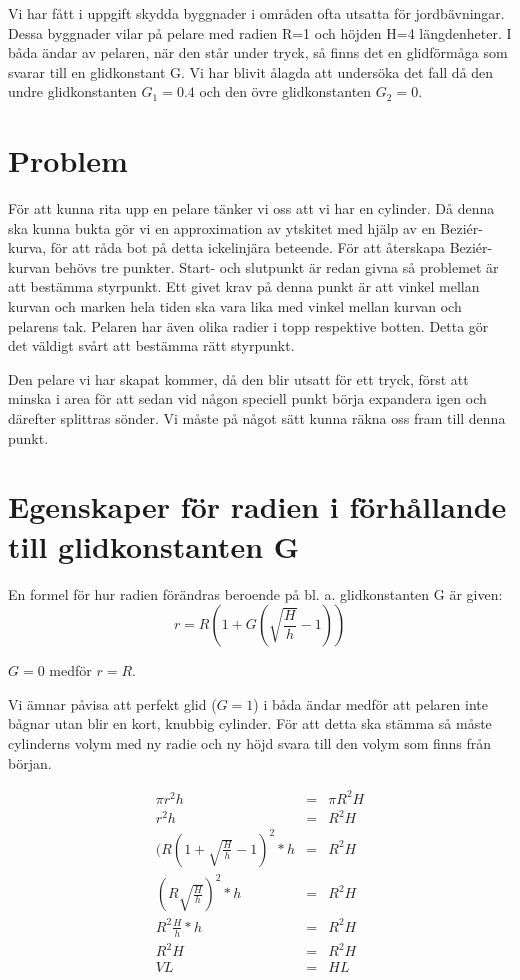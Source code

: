 \documentclass[a4paper,10pt]{article}
\begin{document}
	Vi har fått i uppgift skydda byggnader i områden ofta utsatta för jordbävningar. Dessa byggnader vilar på pelare med radien R=1 och höjden H=4 längdenheter. I båda ändar av pelaren, när den står under tryck, så finns det en glidförmåga som svarar till en glidkonstant G. Vi har blivit ålagda att undersöka det fall då  den undre glidkonstanten $G_1 = 0.4 $ och den övre glidkonstanten $G_2 = 0$.

\section{Problem}

För att kunna rita upp en pelare tänker vi oss att vi har en cylinder. Då denna ska kunna bukta gör vi en approximation av ytskitet med hjälp av en Beziér-kurva, för att råda bot på detta ickelinjära beteende. För att återskapa Beziér-kurvan behövs tre punkter. Start- och slutpunkt är redan givna så problemet är att bestämma styrpunkt. Ett givet krav på denna punkt är att vinkel mellan kurvan och marken hela tiden ska vara lika med vinkel mellan kurvan och pelarens tak. Pelaren har även olika radier i topp respektive botten. Detta gör det väldigt svårt att bestämma rätt styrpunkt. 

Den pelare vi har skapat kommer, då den blir utsatt för ett tryck, först att minska i area för att sedan vid någon speciell punkt börja expandera igen och därefter splittras sönder. Vi måste på något sätt kunna räkna oss fram till denna punkt.

\section {Egenskaper för radien i förhållande till glidkonstanten G}

	En formel för hur radien förändras beroende på bl. a. glidkonstanten G är given:
		$$r = R(1+G(\sqrt{\frac{H}{h}}-1)) $$

	$G=0$ medför $r = R$.

	Vi ämnar påvisa att perfekt glid ($G=1$) i båda ändar medför att pelaren inte bågnar utan blir en kort, knubbig cylinder. För att detta ska stämma så måste cylinderns volym med ny radie och ny höjd svara till den volym som finns från början.

	\begin{eqnarray*}
		\pi r^2 h &=& \pi R^2 H \\
		r^2 h &=& R^2 H \\
		(R(1+\sqrt{\frac{H}{h}}-1)^2*h &=& R^2 H \\
		(R \sqrt{\frac{H}{h}}) ^2*h &=& R^2 H \\
		R^2 \frac{H}{h}*h &=& R^2 H \\
		R^2 H &=& R^2 H \\
		VL &=& HL
	\end{eqnarray*}
\end{document}
